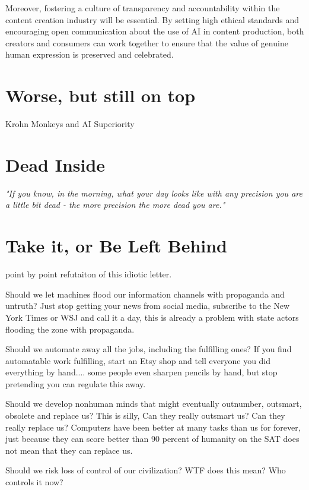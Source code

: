 Moreover, fostering a culture of transparency and accountability within the content creation industry will be essential. By setting high ethical standards and encouraging open communication about the use of AI in content production, both creators and consumers can work together to ensure that the value of genuine human expression is preserved and celebrated.

\section{Worse, but still on top}

Krohn Monkeys and AI Superiority \cite{KrohnTED}

\section{Dead Inside}

\textit{"If you know, in the morning, what your day looks like with any precision you are a little bit dead - the more precision the more dead you are."}\cite{procrustes}

\section{Take it, or Be Left Behind}

point by point refutaiton of this idiotic letter. \cite{dumbestletter}

Should we let machines flood our information channels with propaganda and untruth? Just stop getting your news from social media, subscribe to the New York Times or WSJ and call it a day, this is already a problem with state actors flooding the zone with propaganda.

Should we automate away all the jobs, including the fulfilling ones? If you find automatable work fulfilling, start an Etsy shop and tell everyone you did everything by hand.... some people even sharpen pencils by hand, but stop pretending you can regulate this away. 

Should we develop nonhuman minds that might eventually outnumber, outsmart, obsolete and replace us? This is silly, Can they really outsmart us? Can they really replace us? Computers have been better at many tasks than us for forever, just because they can score better than 90 percent of humanity on the SAT does not mean that they can replace us. 

Should we risk loss of control of our civilization? WTF does this mean? Who controls it now?

